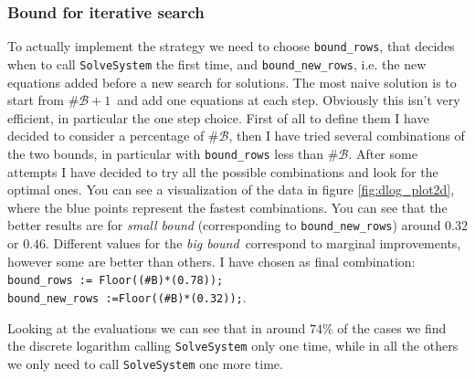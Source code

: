 \documentclass{article}
\newcommand{\BB}{\mathcal{B}}
\theoremstyle{plain}
\theoremstyle{remark}
\theoremstyle{definition}
\begin{document}
\subsubsection{Bound for iterative search} \label{sssec:bounds}
To actually implement the strategy we need to choose \verb|bound_rows|, that decides when to call \texttt{SolveSystem} the first time, and \verb|bound_new_rows|, i.e. the new equations added before a new search for solutions. 
The most naive solution is to start from $\# \BB + 1$ and add one equations at each step. Obviously this isn't very efficient, in particular the one step choice. 
First of all to define them I have decided to consider a percentage of $\# \BB$, then I have tried several combinations of the two bounds, in particular with \verb|bound_rows| less than $\# \BB$. After some attempts I have decided to try all the possible combinations and look for the optimal ones. You can see a visualization of the data in figure \ref{fig:dlog_plot2d}, where the blue points represent the fastest combinations. You can see that the better results are for \textit{small bound} (corresponding to \verb|bound_new_rows|) around $0.32$ or $0.46$. Different values for the \textit{big bound} correspond to marginal improvements, however some are better than others. I have chosen as final combination: \\
\verb|bound_rows := Floor((#B)*(0.78));| \\ \verb|bound_new_rows :=Floor((#B)*(0.32));|. 


Looking at the evaluations we can see that in around $74\%$ of the cases we find the discrete logarithm calling \texttt{SolveSystem} only one time, while in all the others we only need to call \texttt{SolveSystem} one more time.
\end{document}
